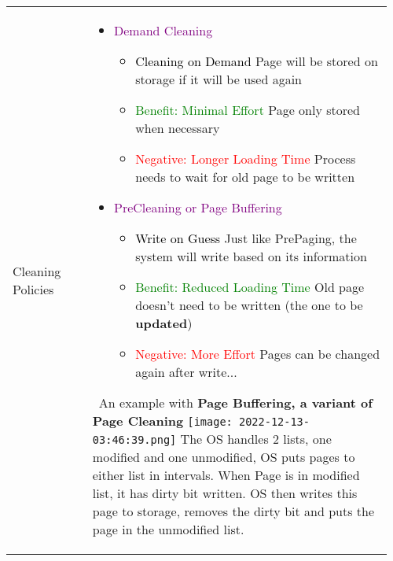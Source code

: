 \documentclass[main.tex,fontsize=8pt,paper=a4,paper=portrait,DIV=calc,]{scrartcl}
\begin{document}
\begin{table}[ht!]
\begin{tabular}{|m{0.2\linewidth}|m{0.755\linewidth}|}
\hline
Cleaning Policies &
\vspace{2mm}
\begin{itemize}
\item \textcolor{purple}{Demand Cleaning}\newline
  \begin{itemize}
  \item \textcolor{black}{Cleaning on Demand}\newline
  Page will be stored on storage if it will be used again
  \item \textcolor{green}{Benefit: Minimal Effort}\newline
    Page only stored when necessary
  \item \textcolor{red}{Negative: Longer Loading Time}\newline
  Process needs to wait for old page to be written
  \end{itemize} 
\item \textcolor{purple}{PreCleaning or Page Buffering}\newline
  \begin{itemize}
  \item \textcolor{black}{Write on Guess}\newline
    Just like PrePaging, the system will write based on its information
  \item \textcolor{green}{Benefit: Reduced Loading Time}\newline
    Old page doesn't need to be written (the one to be \textbf{updated})\newline
  \item \textcolor{red}{Negative: More Effort}\newline
    Pages can be changed again after write...
  \end{itemize} 
\vspace{-3mm}
\end{itemize}
\, \newline
An example with \textbf{Page Buffering, a variant of Page Cleaning}\newline
\texttt{[image: 2022-12-13-03:46:39.png]}\newline 
The OS handles 2 lists, one modified and one unmodified, OS puts pages to either list in intervals.\newline
When Page is in modified list, it has dirty bit written. OS then writes this page to storage, removes the dirty bit and puts the page in the unmodified list.\\

\end{tabular}
\end{table}
\end{document}
